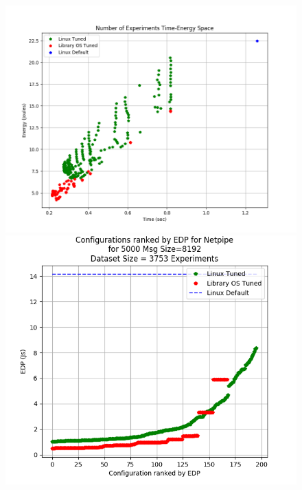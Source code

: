 \documentclass[pageno]{jpaper}
\begin{document}
\begin{figure}
	\includegraphics[width=\columnwidth]{asplos2021_figures/plots3d_netpipe_scatter_points.png}
	\includegraphics[width=\columnwidth]{asplos2021_figures/plots3d_ranked_netpipe_msg8192.png}
\end{figure}
\end{document}
